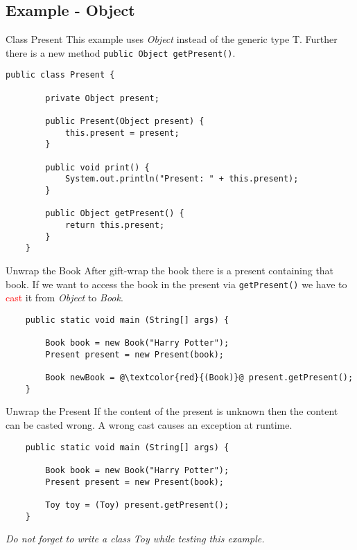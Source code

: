\subsection{Example - Object}
\begin{frame}[fragile]{Class Present}
	This example uses \emph{Object} instead of the generic type T.
	Further there is a new method \texttt{public Object getPresent()}.
	\begin{lstlisting}[basicstyle=\ttfamily\scriptsize]
	public class Present {
	    
	    private Object present;
	    
	    public Present(Object present) {
	        this.present = present;
	    }
	    
	    public void print() {
	        System.out.println("Present: " + this.present);
	    }
	    
	    public Object getPresent() {
	        return this.present;
	    }
	}
	\end{lstlisting}
\end{frame}

\begin{frame}[fragile]{Unwrap the Book}
	After gift-wrap the book there is a present containing that book.
	\vfill
	If we want to access the book in the present via \texttt{getPresent()} 
	we have to \textcolor{red}{cast} it from \emph{Object} to \emph{Book}.
	\begin{lstlisting}
	public static void main (String[] args) {
	    
	    Book book = new Book("Harry Potter");	    
	    Present present = new Present(book);
	    
	    Book newBook = @\textcolor{red}{(Book)}@ present.getPresent();
	}
	\end{lstlisting}
\end{frame}

\begin{frame}[fragile]{Unwrap the Present}
	If the content of the present is unknown then the content can be casted wrong.
	A wrong cast causes an exception at runtime.
	\vfill
	\begin{lstlisting}
	public static void main (String[] args) {
	    
	    Book book = new Book("Harry Potter");	    
	    Present present = new Present(book);
	    
	    Toy toy = (Toy) present.getPresent();
	}
	\end{lstlisting}
	\vfill
	\emph{Do not forget to write a class Toy while testing this example.}
\end{frame}

